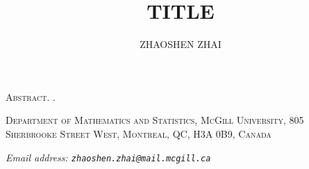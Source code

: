 \documentclass[reqno, twoside]{article}
\begin{document}
    \title{\textbf{\normalsize\MakeUppercase{TITLE}}}
    \author{\footnotesize\MakeUppercase{Zhaoshen Zhai}}
    \date{}
    \maketitle

    \begin{center}
        \vspace{-0.3in}
        \begin{minipage}{0.85\textwidth}
            {\footnotesize{\textsc{Abstract.}} \TODO.}
        \end{minipage}
        \vspace{0.1in}
    \end{center}

    


    {\footnotesize
        \vspace{0.2in}
        \textsc{Department of Mathematics and Statistics, McGill University, 805 Sherbrooke Street West, Montreal, QC, H3A 0B9, Canada}

        \textit{Email address: \tt{zhaoshen.zhai@mail.mcgill.ca}}
    }
\end{document}
